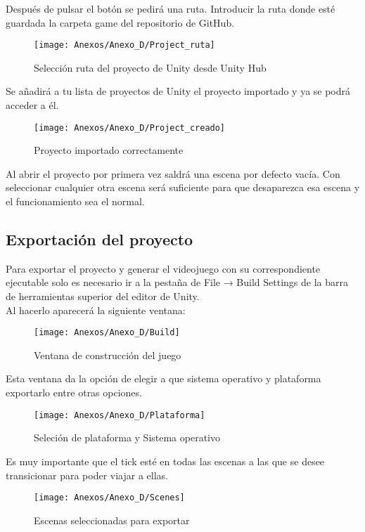 Después de pulsar el botón se pedirá una ruta. Introducir la ruta donde esté guardada la carpeta game del repositorio de GitHub.

\begin{figure}[h]
\centering
\texttt{[image: Anexos/Anexo\_D/Project\_ruta]}
\caption{Selección ruta del proyecto de Unity desde Unity Hub}
\end{figure}

Se añadirá a tu lista de proyectos de Unity el proyecto importado y ya se podrá acceder a él.

\begin{figure}[h]
\centering
\texttt{[image: Anexos/Anexo\_D/Project\_creado]}
\caption{Proyecto importado correctamente}
\end{figure}

Al abrir el proyecto por primera vez saldrá una escena por defecto vacía. Con seleccionar cualquier otra escena será suficiente para que desaparezca esa escena y el funcionamiento sea el normal.

\subsection{Exportación del proyecto}
Para exportar el proyecto y generar el videojuego con su correspondiente ejecutable solo es necesario ir a la pestaña de File → Build Settings de la barra de herramientas superior del editor de Unity.\\
Al hacerlo aparecerá la siguiente ventana:

\begin{figure}[h]
\centering
\texttt{[image: Anexos/Anexo\_D/Build]}
\caption{Ventana de construcción del juego}
\end{figure}

Esta ventana da la opción de elegir a que sistema operativo y plataforma exportarlo entre otras opciones.

\begin{figure}[h]
\centering
\texttt{[image: Anexos/Anexo\_D/Plataforma]}
\caption{Seleción de plataforma y Sistema operativo}
\end{figure}

Es muy importante que el tick esté en todas las escenas a las que se desee transicionar para poder viajar a ellas.

\begin{figure}[h]
\centering
\texttt{[image: Anexos/Anexo\_D/Scenes]}
\caption{Escenas seleccionadas para exportar}
\end{figure}


